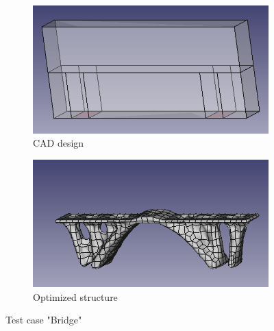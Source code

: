 \begin{figure}[H]
\begin{subfigure}[t]{.45\textwidth}
\begin{center}
\includegraphics[width=.9\textwidth]{Pictures/Results/BridgeIn.png}
\end{center}
\caption{CAD design}
\label{fig:bridgeCAD}
\end{subfigure}
\begin{subfigure}[t]{.45\textwidth}
\begin{center}
\includegraphics[width=.9\textwidth]{Pictures/Results/BridgeOut.png}
\end{center}
\caption{Optimized structure}
\label{fig:bridgeOPTIM}
\end{subfigure}
\caption{Test case "Bridge"}
\end{figure}

